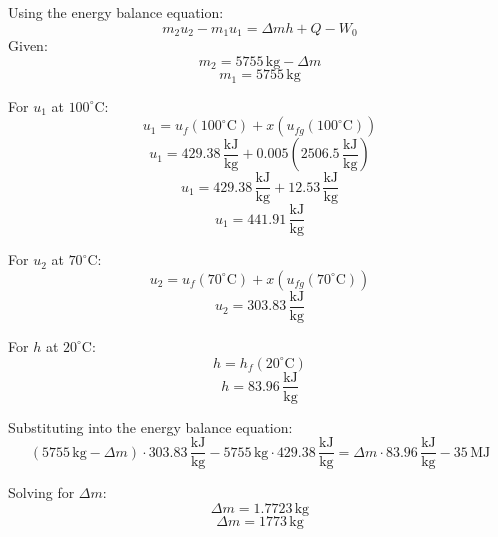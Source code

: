 Using the energy balance equation:  
\[
m_2 u_2 - m_1 u_1 = \Delta m h + Q - W_0
\]  
Given:  
\[
m_2 = 5755 \, \text{kg} - \Delta m
\]  
\[
m_1 = 5755 \, \text{kg}
\]  

For \( u_1 \) at \( 100^\circ\text{C} \):  
\[
u_1 = u_f(100^\circ\text{C}) + x(u_{fg}(100^\circ\text{C}))
\]  
\[
u_1 = 429.38 \, \frac{\text{kJ}}{\text{kg}} + 0.005 \left(2506.5 \, \frac{\text{kJ}}{\text{kg}}\right)
\]  
\[
u_1 = 429.38 \, \frac{\text{kJ}}{\text{kg}} + 12.53 \, \frac{\text{kJ}}{\text{kg}}
\]  
\[
u_1 = 441.91 \, \frac{\text{kJ}}{\text{kg}}
\]  

For \( u_2 \) at \( 70^\circ\text{C} \):  
\[
u_2 = u_f(70^\circ\text{C}) + x(u_{fg}(70^\circ\text{C}))
\]  
\[
u_2 = 303.83 \, \frac{\text{kJ}}{\text{kg}}
\]  

For \( h \) at \( 20^\circ\text{C} \):  
\[
h = h_f(20^\circ\text{C})
\]  
\[
h = 83.96 \, \frac{\text{kJ}}{\text{kg}}
\]  

Substituting into the energy balance equation:  
\[
(5755 \, \text{kg} - \Delta m) \cdot 303.83 \, \frac{\text{kJ}}{\text{kg}} - 5755 \, \text{kg} \cdot 429.38 \, \frac{\text{kJ}}{\text{kg}} = \Delta m \cdot 83.96 \, \frac{\text{kJ}}{\text{kg}} - 35 \, \text{MJ}
\]  

Solving for \( \Delta m \):  
\[
\Delta m = 1.7723 \, \text{kg}
\]  
\[
\Delta m = 1773 \, \text{kg}
\]